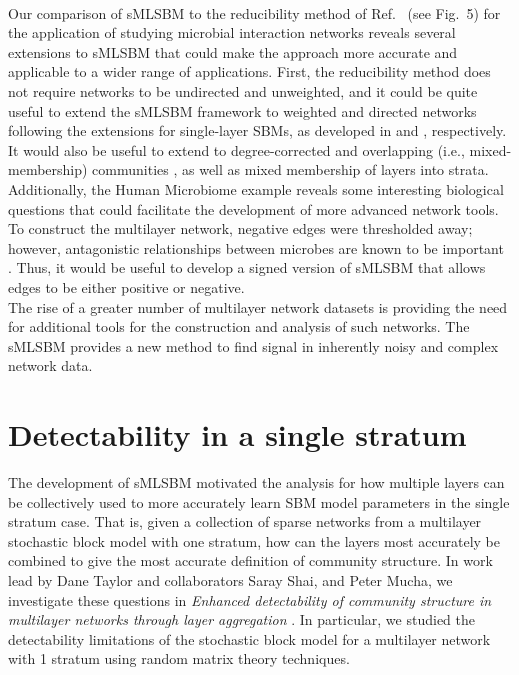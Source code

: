 %
\\\indent Our comparison of sMLSBM to the reducibility method of Ref.~\cite{domen} (see Fig.~5) for the application of studying microbial interaction networks reveals several extensions to sMLSBM that could make the approach more accurate and applicable to a wider range of applications. 
First, the reducibility method \cite{domen} does not require networks to be undirected and unweighted, and it could be quite useful to extend the sMLSBM framework to
weighted and directed networks following the extensions for single-layer SBMs, as developed in \cite{weightSBM} and \cite{sbmdirect}, respectively. 
It would also be useful to extend to degree-corrected and overlapping (i.e., mixed-membership) communities \cite{degreecorrectSBM}, as well as mixed membership of layers into strata.
%
%
Additionally, the Human Microbiome example reveals some interesting biological questions that could facilitate the development of more advanced network tools. To construct the multilayer network, negative edges were thresholded away; however, antagonistic relationships between microbes are known to be important \cite{antagonism}. Thus, it would be useful to develop a signed version of sMLSBM that allows edges to be either positive or negative. \\
\indent The rise of a greater number of multilayer network datasets is providing the need for additional tools for the construction and analysis of such networks. The sMLSBM provides a new method to find signal in inherently noisy and complex network data. 

\section{Detectability in a single stratum}
The development of sMLSBM motivated the analysis for how multiple layers can be collectively used to more accurately learn SBM model parameters in the single stratum case. That is, given a collection of sparse networks from a multilayer stochastic block model with one stratum, how can the layers most accurately be combined to give the most accurate definition of community structure. In work lead by Dane Taylor and collaborators Saray Shai, and Peter Mucha, we investigate these questions in \emph{Enhanced detectability of community structure in multilayer networks through layer aggregation} \cite{taylor2015enhanced}. In particular, we studied the detectability limitations of the stochastic block model for a multilayer network with 1 stratum using random matrix theory techniques. 


